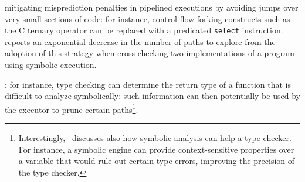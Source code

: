 
 mitigating misprediction penalties in pipelined executions by avoiding jumps over very small sections of code: for instance, control-flow forking constructs such as the C ternary operator can be replaced with a predicated {\tt select} instruction. \cite{CCK-EUROSYS11} reports an exponential decrease in the number of paths to explore from the adoption of this strategy when cross-checking two implementations of a program using symbolic execution. %

:  for instance, type checking can determine the return type of a function that is difficult to analyze symbolically: such information can then potentially be used by the executor to prune certain paths\footnote{Interestingly,~\cite{KCF-PLDI10} discusses also how symbolic analysis can help a type checker. For instance, a symbolic engine can provide context-sensitive properties over a variable that would rule out certain type errors, improving the precision of the type checker.}.


